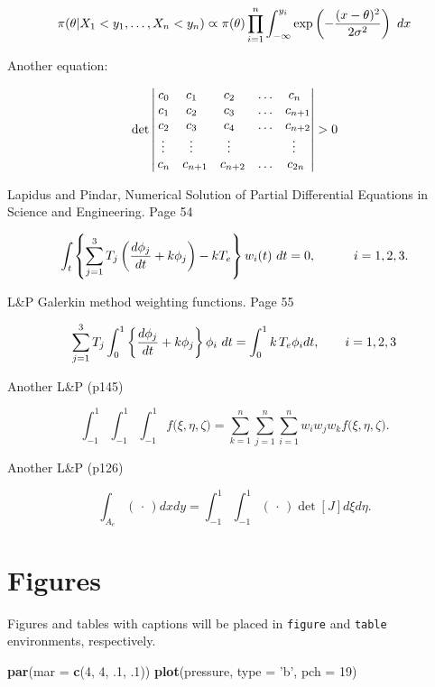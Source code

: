 \documentclass[12pt,letterpaper,oneside,oldfontcommands]{memoir}
\newenvironment{Shaded}{\begin{snugshade}}{\end{snugshade}}
\newcommand{\DataTypeTok}[1]{\textcolor[rgb]{0.13,0.29,0.53}{#1}}
\newcommand{\DecValTok}[1]{\textcolor[rgb]{0.00,0.00,0.81}{#1}}
\newcommand{\FloatTok}[1]{\textcolor[rgb]{0.00,0.00,0.81}{#1}}
\newcommand{\KeywordTok}[1]{\textcolor[rgb]{0.13,0.29,0.53}{\textbf{#1}}}
\newcommand{\NormalTok}[1]{#1}
\newcommand{\StringTok}[1]{\textcolor[rgb]{0.31,0.60,0.02}{#1}}
\theoremstyle{definition}
\theoremstyle{definition}
\theoremstyle{definition}
\theoremstyle{remark}
\begin{document}
\begin{equation}
\pi(\theta|X_1< y_1,\dots,X_n<y_n) \varpropto \pi(\theta) \prod_{i=1}^n\int_{-\infty}^{y_i}
   \exp\left(-{(x-\theta)^2\over{2\sigma^2}}\right)\ dx
\end{equation}

Another equation:

\[\det\left|\,\begin{matrix}%
c_0&c_1\hfill&c_2\hfill&\ldots&c_n\hfill\cr
c_1&c_2\hfill&c_3\hfill&\ldots&c_{n+1}\hfill\cr
c_2&c_3\hfill&c_4\hfill&\ldots&c_{n+2}\hfill\cr
\,\vdots\hfill&\,\vdots\hfill&
  \,\vdots\hfill&&\,\vdots\hfill\cr
c_n&c_{n+1}\hfill&c_{n+2}\hfill&\ldots&c_{2n}\hfill\cr
\end{matrix}\right|>0\]

Lapidus and Pindar, Numerical Solution of Partial Differential Equations
in Science and Engineering. Page 54

\[
\int_t\left\{\sum_{j=1}^3 T_j \left({d\phi_j\over dt}+k\phi_j\right)-kT_e\right\}w_i(t)\ dt=0,
   \qquad\quad i=1,2,3.
\]

L\&P Galerkin method weighting functions. Page 55

\[
\sum_{j=1}^3 T_j\int_0^1\left\{{d\phi_j\over dt} + k\phi_j\right\} \phi_i\ dt
   = \int_{0}^1k\,T_e\phi_idt, \qquad i=1,2,3 \]

Another L\&P (p145)

\[
\int_{-1}^1\!\int_{-1}^1\!\int_{-1}^1 f\big(\xi,\eta,\zeta\big)
   = \sum_{k=1}^n\sum_{j=1}^n\sum_{i=1}^n w_i w_j w_k f\big( \xi,\eta,\zeta\big).
\]

Another L\&P (p126)

\[
\int_{A_e} (\,\cdot\,) dx dy = \int_{-1}^1\!\int_{-1}^1 (\,\cdot\,) \det[J] d\xi d\eta.
\]

\hypertarget{figures}{%
\section{Figures}\label{figures}}

Figures and tables with captions will be placed in \texttt{figure} and
\texttt{table} environments, respectively.

\begin{Shaded}
\begin{Highlighting}[]
\KeywordTok{par}\NormalTok{(}\DataTypeTok{mar =} \KeywordTok{c}\NormalTok{(}\DecValTok{4}\NormalTok{, }\DecValTok{4}\NormalTok{, }\FloatTok{.1}\NormalTok{, }\FloatTok{.1}\NormalTok{))}
\KeywordTok{plot}\NormalTok{(pressure, }\DataTypeTok{type =} \StringTok{'b'}\NormalTok{, }\DataTypeTok{pch =} \DecValTok{19}\NormalTok{)}
\end{Highlighting}
\end{Shaded}
\end{document}
